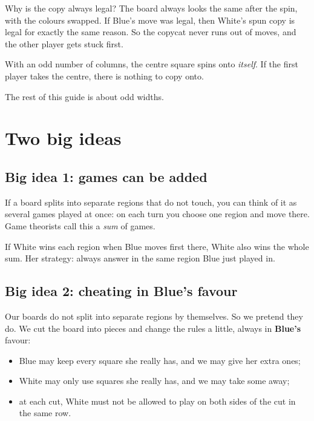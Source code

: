 \documentclass[11pt]{article}
\begin{document}
\begin{center}
\end{center}

Why is the copy always legal? The board always looks the same after the spin,
with the colours swapped. If Blue's move was legal, then White's spun copy is
legal for exactly the same reason. So the copycat never runs out of moves, and
the other player gets stuck first.

\begin{careful}
With an odd number of columns, the centre square spins onto \emph{itself}. If
the first player takes the centre, there is nothing to copy onto.
\begin{center}\end{center}
The rest of this guide is about odd widths.
\end{careful}

\section{Two big ideas}

\subsection{Big idea 1: games can be added}

If a board splits into separate regions that do not touch, you can think of
it as several games played at once: on each turn you choose one region and
move there. Game theorists call this a \emph{sum} of games.

\begin{center}
\end{center}

\begin{idea}
If White wins each region when Blue moves first there, White also wins the
whole sum. Her strategy: always answer in the same region Blue just played in.
\end{idea}

\subsection{Big idea 2: cheating in Blue's favour}

Our boards do not split into separate regions by themselves. So we pretend
they do. We cut the board into pieces and change the rules a little, always in
\textbf{Blue's} favour:
\begin{itemize}[nosep]
\item Blue may keep every square she really has, and we may give her extra
ones;
\item White may only use squares she really has, and we may take some away;
\item at each cut, White must not be allowed to play on both sides of the cut
in the same row.
\end{itemize}
\end{document}
